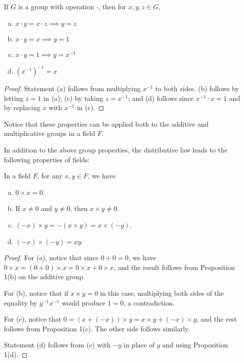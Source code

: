 \begin{proposition}
If $G$ is a group with operation $\cdot$, then for $x, y, z \in G$,
\begin{enumerate}[(a)]
\item $x \cdot y = x \cdot z \implies y = z$
\item $x \cdot y = x \implies y = 1$
\item $x \cdot y = 1 \implies y = x^{-1}$
\item $(x^{-1})^{-1} = x$
\end{enumerate}
\begin{proof}
Statement (a) follows from multiplying $x^{-1}$ to both sides. (b) follows by letting $z = 1$ in (a); (c) by taking $z = x^{-1}$; and (d) follows since $x^{-1} \cdot x = 1$ and by replacing $x$ with $x^{-1}$ in (c). 
\end{proof}
Notice that these properties can be applied both to the additive and multiplicative groups in a field $F$. 
\end{proposition}

In addition to the above group properties, the distributive law leads to the following properties of fields:

\begin{proposition}
In a field $F$, for any $x, y \in F$, we have
\begin{enumerate}[(a)]
\item $0 \times x = 0$.
\item If $x \ne 0$ and $y \ne 0$, then $x \times y \ne 0$.
\item $(-x) \times y = - (x \times y) = x \times (-y)$.
\item $(-x) \times (-y) = xy$.
\end{enumerate}

\begin{proof}
For (a), notice that since $0 + 0 = 0$, we have $0 \times x = (0 + 0) \times x = 0 \times x + 0 \times x$, and the result follows from Proposition 1(b) on the additive group.

For (b), notice that if $x \times y = 0$ in this case, multiplying both sides of the equality by $y^{-1}x^{-1}$ would produce $1 = 0$, a contradiction.

For (c), notice that $0 = (x + (-x)) \times y = x \times y + (-x) \times y$, and the rest follows from Proposition 1(c). The other side follows similarly.

Statement (d) follows from (c) with $-y$ in place of $y$ and using Proposition 1(d). 
\end{proof}
\end{proposition}

